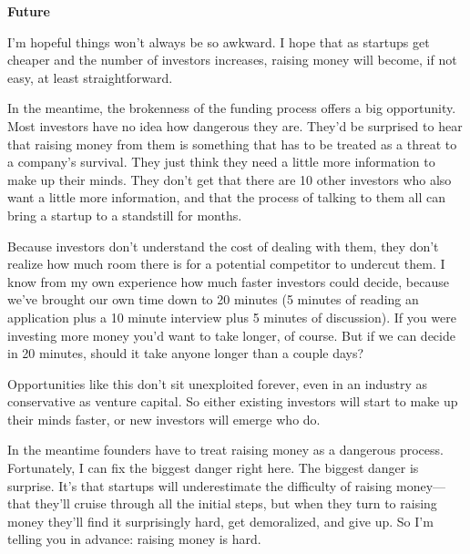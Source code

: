                   \textbf{Future}

I'm hopeful things won't always be so
                  awkward. I hope that as startups get cheaper and the number of
                  investors increases, raising money will become, if not easy,
                  at least straightforward.

In the meantime, the
                  brokenness of the funding process offers a big opportunity.
                  Most investors have no idea how dangerous they are. They'd be
                  surprised to hear that raising money from them is something
                  that has to be treated as a threat to a company's survival.
                  They just think they need a little more information to make up
                  their minds. They don't get that there are 10 other investors
                  who also want a little more information, and that the process
                  of talking to them all can bring a startup to a standstill for
                  months.

Because investors don't understand the cost
                  of dealing with them, they don't realize how much room there
                  is for a potential competitor to undercut them. I know from my
                  own experience how much faster investors could decide, because
                  we've brought our own time down to 20 minutes (5 minutes of
                  reading an application plus a 10 minute interview plus 5
                  minutes of discussion). If you were investing more money you'd
                  want to take longer, of course. But if we can decide in 20
                  minutes, should it take anyone longer than a couple days?

Opportunities
                  like this don't sit unexploited forever, even in an industry
                  as conservative as venture capital. So either existing
                  investors will start to make up their minds faster, or new
                  investors will emerge who do.

In the meantime
                  founders have to treat raising money as a dangerous process.
                  Fortunately, I can fix the biggest danger right here. The
                  biggest danger is surprise. It's that startups will
                  underestimate the difficulty of raising money---that
                  they'll cruise through all the initial steps, but when they
                  turn to raising money they'll find it surprisingly hard, get
                  demoralized, and give up. So I'm telling you in advance:
                  raising money is hard.





